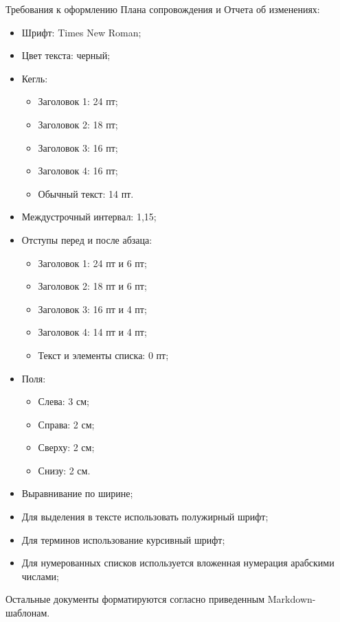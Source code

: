 Требования к оформлению Плана сопровождения и Отчета об изменениях:
\begin{itemize}
    \item Шрифт: Times New Roman;
    \item Цвет текста: черный;
    \item Кегль:
    \begin{itemize}
        \item Заголовок 1: 24 пт;
        \item Заголовок 2: 18 пт;
        \item Заголовок 3: 16 пт;
        \item Заголовок 4: 16 пт;
        \item Обычный текст: 14 пт.
    \end{itemize}
    \item Междустрочный интервал: 1,15;
    \item Отступы перед и после абзаца:
    \begin{itemize}
        \item Заголовок 1: 24 пт и 6 пт;
        \item Заголовок 2: 18 пт и 6 пт;
        \item Заголовок 3: 16 пт и 4 пт;
        \item Заголовок 4: 14 пт и 4 пт;
        \item Текст и элементы списка: 0 пт;
    \end{itemize}
    \item Поля:
    \begin{itemize}
        \item Слева: 3 см;
        \item Справа: 2 см;
        \item Сверху: 2 см;
        \item Снизу: 2 см.
    \end{itemize}
    \item Выравнивание по ширине;
    \item Для выделения в тексте использовать полужирный шрифт;
    \item Для терминов использование курсивный шрифт;
    \item Для нумерованных списков используется вложенная нумерация арабскими числами;
\end{itemize}

Остальные документы форматируются согласно приведенным Markdown-шаблонам.

